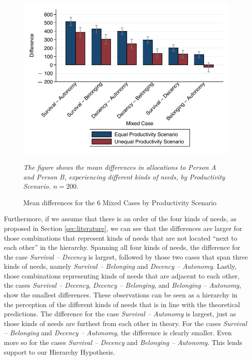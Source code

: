 \documentclass[egregdoesnotlikesansseriftitles]{scrartcl}
\begin{document}
\begin{figure}[t]
   \centering
   \includegraphics[width=.75\textwidth]{figures/figure_5.pdf}
   \begin{minipage}{0.75\linewidth}
   \footnotesize
   \emph{The figure shows the mean differences in allocations to Person A and Person B, experiencing different kinds of needs, by Productivity Scenario. $n = 200$.}
   \end{minipage}
   \caption{Mean differences for the 6 Mixed Cases by Productivity Scenario}
   \label{fig:overview_mixed}
\end{figure}

Furthermore, if we assume that there is an order of the four kinds of needs, as proposed in Section \ref{sec:literature}, we can see that the differences are larger for those combinations that represent kinds of needs that are not located ``next to each other'' in the hierarchy.
Spanning all four kinds of needs, the difference for the case \textit{Survival -- Decency} is largest, followed by those two cases that span three kinds of needs, namely \textit{Survival -- Belonging} and \textit{Decency -- Autonomy}.
Lastly, those combinations representing kinds of needs that are adjacent to each other, the cases \textit{Survival -- Decency}, \textit{Decency -- Belonging}, and \textit{Belonging -- Autonomy}, show the smallest differences.
These observations can be seen as a hierarchy in the perception of the different kinds of needs that is in line with the theoretical predictions.
The difference for the case \textit{Survival -- Autonomy} is largest, just as those kinds of needs are furthest from each other in theory.
For the cases \textit{Survival -- Belonging} and \textit{Decency -- Autonomy}, the difference is clearly smaller.
Even more so for the cases \textit{Survival -- Decency} and \textit{Belonging -- Autonomy}.
This lends support to our Hierarchy Hypothesis.
\end{document}

